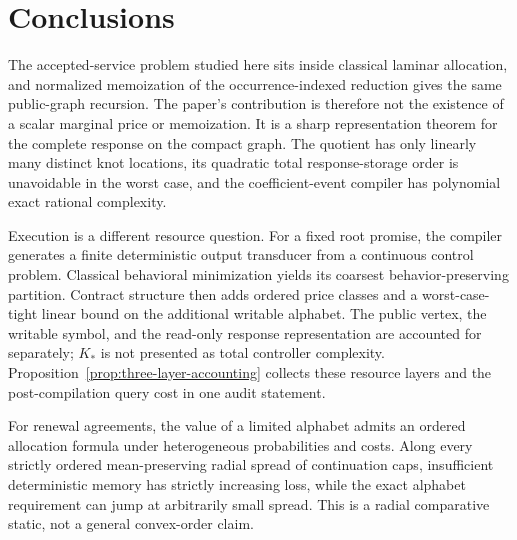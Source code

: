 \documentclass[11pt,letterpaper]{article}
\theoremstyle{definition}\newtheorem{assumption}[theorem]{Assumption}
\begin{document}
\hypersetup{pageanchor=true}








\section{Conclusions}\label{sec:conclusion}
The accepted-service problem studied here sits inside classical laminar allocation, and normalized memoization of the occurrence-indexed reduction gives the same public-graph recursion. The paper's contribution is therefore not the existence of a scalar marginal price or memoization. It is a sharp representation theorem for the complete response on the compact graph. The quotient has only linearly many distinct knot locations, its quadratic total response-storage order is unavoidable in the worst case, and the coefficient-event compiler has polynomial exact rational complexity.

Execution is a different resource question. For a fixed root promise, the compiler generates a finite deterministic output transducer from a continuous control problem. Classical behavioral minimization yields its coarsest behavior-preserving partition. Contract structure then adds ordered price classes and a worst-case-tight linear bound on the additional writable alphabet. The public vertex, the writable symbol, and the read-only response representation are accounted for separately; $K_*$ is not presented as total controller complexity. Proposition~\ref{prop:three-layer-accounting} collects these resource layers and the post-compilation query cost in one audit statement.

For renewal agreements, the value of a limited alphabet admits an ordered allocation formula under heterogeneous probabilities and costs. Along every strictly ordered mean-preserving radial spread of continuation caps, insufficient deterministic memory has strictly increasing loss, while the exact alphabet requirement can jump at arbitrarily small spread. This is a radial comparative static, not a general convex-order claim.
\end{document}
